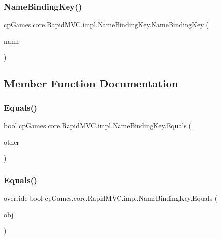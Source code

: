 \subsubsection{\texorpdfstring{NameBindingKey()}{NameBindingKey()}}
{\footnotesize\ttfamily cp\+Games.\+core.\+Rapid\+M\+V\+C.\+impl.\+Name\+Binding\+Key.\+Name\+Binding\+Key (\begin{DoxyParamCaption}\item[{string}]{name }\end{DoxyParamCaption})}



\subsection{Member Function Documentation}
\mbox{\label{classcp_games_1_1core_1_1_rapid_m_v_c_1_1impl_1_1_name_binding_key_ab888c3e48bc20e7d665ed590d946b80a}} 
\subsubsection{\texorpdfstring{Equals()}{Equals()}\hspace{0.1cm}{\footnotesize\ttfamily [1/2]}}
{\footnotesize\ttfamily bool cp\+Games.\+core.\+Rapid\+M\+V\+C.\+impl.\+Name\+Binding\+Key.\+Equals (\begin{DoxyParamCaption}\item[{\mbox{\hyperlink{classcp_games_1_1core_1_1_rapid_m_v_c_1_1impl_1_1_name_binding_key}{Name\+Binding\+Key}}}]{other }\end{DoxyParamCaption})\hspace{0.3cm}{\ttfamily [protected]}}

\mbox{\label{classcp_games_1_1core_1_1_rapid_m_v_c_1_1impl_1_1_name_binding_key_a23148495945655699d812eb768e7bf5e}} 
\subsubsection{\texorpdfstring{Equals()}{Equals()}\hspace{0.1cm}{\footnotesize\ttfamily [2/2]}}
{\footnotesize\ttfamily override bool cp\+Games.\+core.\+Rapid\+M\+V\+C.\+impl.\+Name\+Binding\+Key.\+Equals (\begin{DoxyParamCaption}\item[{object}]{obj }\end{DoxyParamCaption})}

